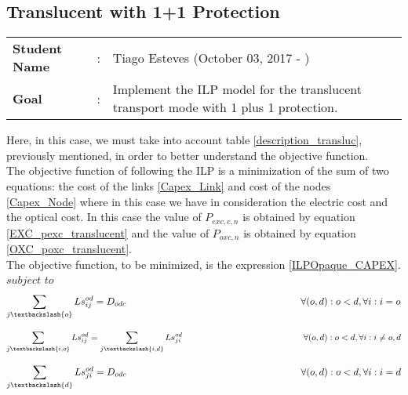 \clearpage

\subsection{Translucent with 1+1 Protection}\label{ILP_Transluc_Protection}
\begin{tcolorbox}	
\begin{tabular}{p{2.75cm} p{0.2cm} p{10.5cm}} 	
\textbf{Student Name}  &:& Tiago Esteves    (October 03, 2017 - )\\
\textbf{Goal}          &:& Implement the ILP model for the translucent transport mode with 1 plus 1 protection.
\end{tabular}
\end{tcolorbox}
\vspace{11pt}

Here, in this case, we must take into account table \ref{description_transluc}, previously mentioned, in order to better understand the objective function.\\

The objective function of following the ILP is a minimization of the sum of two equations: the cost of the links \ref{Capex_Link} and cost of the nodes \ref{Capex_Node} where in this case we have in consideration the electric cost and the optical cost.
In this case the value of $P_{exc,c,n}$ is obtained by equation \ref{EXC_pexc_translucent} and the value of $P_{oxc,n}$ is obtained by equation \ref{OXC_poxc_translucent}.\\

\vspace{17pt}
The objective function, to be minimized, is the expression \ref{ILPOpaque_CAPEX}.\\

$subject$ $to$
\begin{equation}
\sum_{j\textbackslash \{o\}} Ls_{ij}^{od} = D_{odc}  \qquad \qquad \qquad \qquad \qquad \qquad \qquad \qquad \qquad
\forall(o,d) : o < d, \forall i: i = o
\label{ILPTranslucp1}
\end{equation}

\begin{equation}
\sum_{j\textbackslash \{i,o\}} Ls_{ij}^{od} = \sum_{j\textbackslash \{i,d\}} Ls_{ji}^{od} \qquad \qquad \qquad \qquad \qquad \qquad \qquad
\forall(o,d) : o < d, \forall i: i \neq o,d
\label{ILPTranslucp2}
\end{equation}

\begin{equation}
\sum_{j\textbackslash \{d\}} Ls_{ji}^{od} = D_{odc} \qquad \qquad \qquad \qquad \qquad \qquad \qquad \qquad \qquad
\forall(o,d) : o < d, \forall i: i = d
\label{ILPTranslucp3}
\end{equation}

